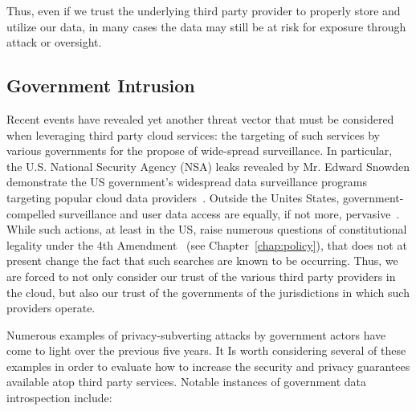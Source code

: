 Thus, even if we trust the underlying third party provider to properly
store and utilize our data, in many cases the data may still be at
risk for exposure through attack or oversight.

\subsection{Government Intrusion}

Recent events have revealed yet another threat vector that must be
considered when leveraging third party cloud services: the targeting
of such services by various governments for the propose of wide-spread
surveillance. In particular, the U.S. National Security Agency (NSA)
leaks revealed by Mr. Edward Snowden demonstrate the US government's
widespread data surveillance programs targeting popular cloud data
providers~\cite{greenwald-prism}.  Outside the Unites States,
government-compelled surveillance and user data access are equally, if
not more, pervasive~\cite{netfreedom2015}.  While such actions, at
least in the US, raise numerous questions of constitutional legality
under the 4th Amendment~\cite{us-constitution-amend4} (see
Chapter~\ref{chap:policy}), that does not at present change the fact
that such searches are known to be occurring. Thus, we are forced to
not only consider our trust of the various third party providers in
the cloud, but also our trust of the governments of the jurisdictions
in which such providers operate.

Numerous examples of privacy-subverting attacks by government actors
have come to light over the previous five years. It Is worth
considering several of these examples in order to evaluate how to
increase the security and privacy guarantees available atop third
party services. Notable instances of government data introspection
include:

